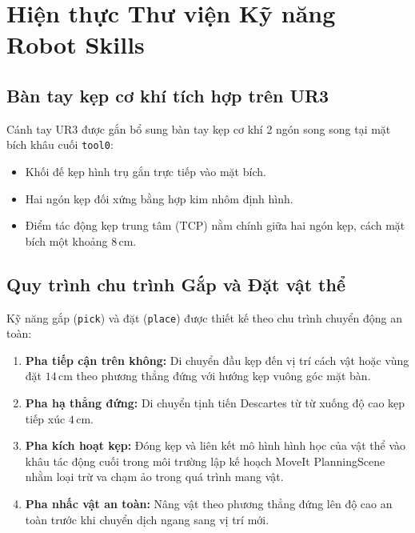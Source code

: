 \documentclass[a4paper,12pt]{article}
\begin{document}
\section{Hiện thực Thư viện Kỹ năng Robot Skills}

\subsection{Bàn tay kẹp cơ khí tích hợp trên UR3}
Cánh tay UR3 được gắn bổ sung bàn tay kẹp cơ khí 2 ngón song song tại mặt bích khâu cuối \texttt{tool0}:
\begin{itemize}[noitemsep]
    \item Khối đế kẹp hình trụ gắn trực tiếp vào mặt bích.
    \item Hai ngón kẹp đối xứng bằng hợp kim nhôm định hình.
    \item Điểm tác động kẹp trung tâm (TCP) nằm chính giữa hai ngón kẹp, cách mặt bích một khoảng $8\,\text{cm}$.
\end{itemize}

\subsection{Quy trình chu trình Gắp và Đặt vật thể}
Kỹ năng gắp (\texttt{pick}) và đặt (\texttt{place}) được thiết kế theo chu trình chuyển động an toàn:
\begin{enumerate}
    \item \textbf{Pha tiếp cận trên không:} Di chuyển đầu kẹp đến vị trí cách vật hoặc vùng đặt $14\,\text{cm}$ theo phương thẳng đứng với hướng kẹp vuông góc mặt bàn.
    \item \textbf{Pha hạ thẳng đứng:} Di chuyển tịnh tiến Descartes từ từ xuống độ cao kẹp tiếp xúc $4\,\text{cm}$.
    \item \textbf{Pha kích hoạt kẹp:} Đóng kẹp và liên kết mô hình hình học của vật thể vào khâu tác động cuối trong môi trường lập kế hoạch MoveIt PlanningScene nhằm loại trừ va chạm ảo trong quá trình mang vật.
    \item \textbf{Pha nhấc vật an toàn:} Nâng vật theo phương thẳng đứng lên độ cao an toàn trước khi chuyển dịch ngang sang vị trí mới.
\end{enumerate}

\end{document}
